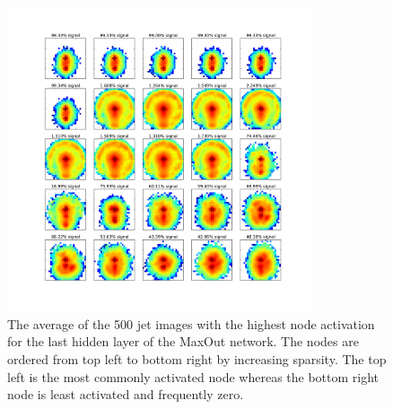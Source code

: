 
\begin{figure}[!htbp]
  \centering
  \includegraphics[width=0.8\textwidth]{figures/maxnodes.pdf}
  \caption{The average of the 500 jet images with the highest node activation  for the last hidden layer of the MaxOut network.  The nodes are ordered from top left to bottom right by increasing sparsity.  The top left is the most commonly activated node whereas the bottom right node is least activated and frequently zero. }
  \label{fig:mostactiviate}
\end{figure}


\clearpage
\newpage

